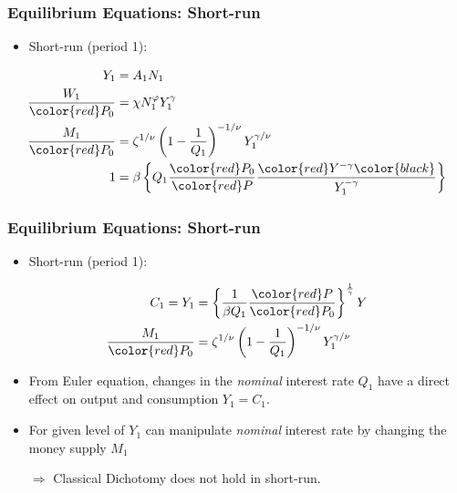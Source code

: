 \documentclass[english,xcolor=svgnames]{beamer}
\begin{document}
\begin{frame}
\frametitle{Equilibrium Equations: Short-run}
\begin{itemize}
	\item Short-run (period 1):
\end{itemize}
\begin{align*}
	Y_1&=A_1N_{1}  \\
	\frac{W_1}{\color{red} P_0}&=\chi N_1^\varphi Y_1^{\gamma} \\
	\frac{M_1}{\color{red} P_0}&=\zeta^{1/\nu}\left(1-\frac{1}{Q_1}\right)^{-1/\nu}Y_{1}^{\gamma/\nu}\\
	1&=\beta \left\{Q_1 \frac{\color{red} P_0}{\color{red} P} \frac{\color{red} Y^{-\gamma}\color{black}}{Y_{1}^{-\gamma}}\right\} 
\end{align*}
\end{frame}

\begin{frame}
\frametitle{Equilibrium Equations: Short-run}
\begin{itemize}
	\item Short-run (period 1):
\end{itemize}
\begin{align*}
	C_1 = Y_1&= \left\{ \frac{1}{\beta Q_1} \frac{\color{red} P}{\color{red} P_0} \right\}^{\frac{1}{\gamma}} Y \\
	\frac{M_1}{\color{red} P_0}&=\zeta^{1/\nu}\left(1-\frac{1}{Q_1}\right)^{-1/\nu}Y_{1}^{\gamma/\nu}\\
\end{align*}
\begin{itemize}
	\item From Euler equation, changes in the \emph{nominal} interest rate $Q_1$ have a direct effect on output and consumption $Y_1 = C_1$.
	\item For given level of $Y_1$ can manipulate \emph{nominal} interest rate by changing the money supply $M_1$
	\item[$\Rightarrow$] Classical Dichotomy does not hold in short-run. 
\end{itemize}
\end{frame}
\end{document}

